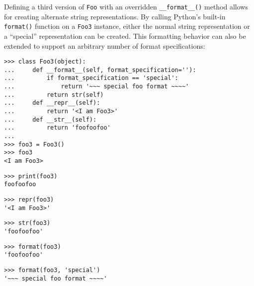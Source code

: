 \noindent Defining a third version of \texttt{Foo} with an overridden
\texttt{\_\_format\_\_()} method allows for creating alternate string
representations. By calling Python's built-in \texttt{format()} function on a
\texttt{Foo3} instance, either the normal string representation or a
\enquote{special} representation can be created. This formatting behavior can
also be extended to support an arbitrary number of format specifications:

\begin{comment}
<abjad>
class Foo3(object):
    def __format__(self, format_specification=''):
        if format_specification == 'special':
            return '~~~ special foo format ~~~~'
        return str(self)
    def __repr__(self):
        return '<I am Foo3>'
    def __str__(self):
        return 'foofoofoo'

foo3 = Foo3()
foo3
print(foo3)
repr(foo3)
str(foo3)
format(foo3)
format(foo3, 'special')
</abjad>
\end{comment}

\begin{abjadbookoutput}
\begin{singlespacing}
\vspace{-0.5\baselineskip}
\begin{verbatim}
>>> class Foo3(object):
...     def __format__(self, format_specification=''):
...         if format_specification == 'special':
...             return '~~~ special foo format ~~~~'
...         return str(self)
...     def __repr__(self):
...         return '<I am Foo3>'
...     def __str__(self):
...         return 'foofoofoo'
...
>>> foo3 = Foo3()
>>> foo3
<I am Foo3>
\end{verbatim}
\begin{verbatim}
>>> print(foo3)
foofoofoo
\end{verbatim}
\begin{verbatim}
>>> repr(foo3)
'<I am Foo3>'
\end{verbatim}
\begin{verbatim}
>>> str(foo3)
'foofoofoo'
\end{verbatim}
\begin{verbatim}
>>> format(foo3)
'foofoofoo'
\end{verbatim}
\begin{verbatim}
>>> format(foo3, 'special')
'~~~ special foo format ~~~~'
\end{verbatim}
\end{singlespacing}
\end{abjadbookoutput}

